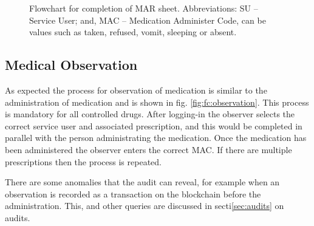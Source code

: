 \documentclass[runningheads]{llncs}
\begin{document}
\begin{figure}
\centering
{}
	\caption{Flowchart for completion of MAR sheet. Abbreviations: SU \--- Service User; and, MAC \--- Medication Administer Code, can be values such as taken, refused, vomit, sleeping or absent.}
	\label{fig:fc:mar}
\end{figure}


\subsection{Medical Observation}
As expected the process for observation of medication is similar to the administration of medication and is shown in fig. \ref{fig:fc:observation}. This process is mandatory for all controlled drugs. After logging-in the observer selects the correct service user and associated prescription, and this would be completed in parallel with the person administrating the medication. Once the medication has been administered the observer enters the correct MAC. If there are multiple prescriptions then the process is repeated.

There are some anomalies that the audit can reveal, for example when an observation is recorded as a transaction on the blockchain before the administration. This, and other queries are discussed in secti\ref{sec:audits} on audits.
\end{document}
